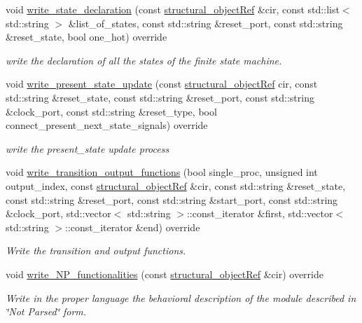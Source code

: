 \begin{DoxyCompactItemize}
void \hyperlink{structVHDL__writer_a0c98259dd9ea0a8ac551a7204e3a734f}{write\+\_\+state\+\_\+declaration} (const \hyperlink{structural__objects_8hpp_a8ea5f8cc50ab8f4c31e2751074ff60b2}{structural\+\_\+object\+Ref} \&cir, const std\+::list$<$ std\+::string $>$ \&list\+\_\+of\+\_\+states, const std\+::string \&reset\+\_\+port, const std\+::string \&reset\+\_\+state, bool one\+\_\+hot) override
\begin{DoxyCompactList}\small\item\em write the declaration of all the states of the finite state machine. \end{DoxyCompactList}\item 
void \hyperlink{structVHDL__writer_a24689039313dfd370692b4c13f2c8862}{write\+\_\+present\+\_\+state\+\_\+update} (const \hyperlink{structural__objects_8hpp_a8ea5f8cc50ab8f4c31e2751074ff60b2}{structural\+\_\+object\+Ref} cir, const std\+::string \&reset\+\_\+state, const std\+::string \&reset\+\_\+port, const std\+::string \&clock\+\_\+port, const std\+::string \&reset\+\_\+type, bool connect\+\_\+present\+\_\+next\+\_\+state\+\_\+signals) override
\begin{DoxyCompactList}\small\item\em write the present\+\_\+state update process \end{DoxyCompactList}\item 
void \hyperlink{structVHDL__writer_a8a3178b0a3f07604df38e02882851374}{write\+\_\+transition\+\_\+output\+\_\+functions} (bool single\+\_\+proc, unsigned int output\+\_\+index, const \hyperlink{structural__objects_8hpp_a8ea5f8cc50ab8f4c31e2751074ff60b2}{structural\+\_\+object\+Ref} \&cir, const std\+::string \&reset\+\_\+state, const std\+::string \&reset\+\_\+port, const std\+::string \&start\+\_\+port, const std\+::string \&clock\+\_\+port, std\+::vector$<$ std\+::string $>$\+::const\+\_\+iterator \&first, std\+::vector$<$ std\+::string $>$\+::const\+\_\+iterator \&end) override
\begin{DoxyCompactList}\small\item\em Write the transition and output functions. \end{DoxyCompactList}\item 
void \hyperlink{structVHDL__writer_a479a39c4d3b15e8052100fca87a45717}{write\+\_\+\+N\+P\+\_\+functionalities} (const \hyperlink{structural__objects_8hpp_a8ea5f8cc50ab8f4c31e2751074ff60b2}{structural\+\_\+object\+Ref} \&cir) override
\begin{DoxyCompactList}\small\item\em Write in the proper language the behavioral description of the module described in \char`\"{}\+Not Parsed\char`\"{} form. \end{DoxyCompactList}\item 

\end{DoxyCompactItemize}
